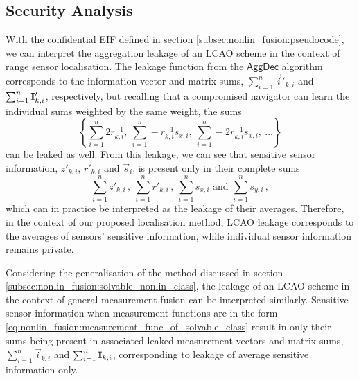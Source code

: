 \subsection{Security Analysis}\label{subsec:nonlin_fusion:security}
With the confidential EIF defined in section \ref{subsec:nonlin_fusion:pseudocode}, we can interpret the aggregation leakage of an LCAO scheme in the context of range sensor localisation. The leakage function from the $\mathsf{AggDec}$ algorithm corresponds to the information vector and matrix sums, $\sum_{i=1}^n\vec{i}'_{k, i}$ and $\sum_{i=1}^n{{\mathbf{I}}}'_{k, i}$, respectively, but recalling that a compromised navigator can learn the individual sums weighted by the same weight, the sums
\begin{equation}
    \left\{\sum_{i=1}^n2r^{-1}_{k, i},\ \sum_{i=1}^n-r^{-1}_{k, i}s_{x, i},\ \sum_{i=1}^n-2r^{-1}_{k, i}s_{x, i},\ \dots\right\}
\end{equation}
can be leaked as well. From this leakage, we can see that sensitive sensor information, $z'_{k, i}$, $r'_{k, i}$ and $\vec{s}_i$, is present only in their complete sums
\begin{equation}\label{eq:nonlin_fusion:localisation_leakage}
    \sum_{i=1}^nz'_{k,i}\,,\ \sum_{i=1}^nr'_{k,i}\,,\ \sum_{i=1}^ns_{x,i} \text{ and } \sum_{i=1}^ns_{y,i}\,,
\end{equation}
which can in practice be interpreted as the leakage of their averages. Therefore, in the context of our proposed localisation method, LCAO leakage corresponds to the averages of sensors' sensitive information, while individual sensor information remains private.

Considering the generalisation of the method discussed in section \ref{subsec:nonlin_fusion:solvable_nonlin_class}, the leakage of an LCAO scheme in the context of general measurement fusion can be interpreted similarly. Sensitive sensor information when measurement functions are in the form \eqref{eq:nonlin_fusion:measurement_func_of_solvable_class} result in only their sums being present in associated leaked measurement vectors and matrix sums, $\sum_{i=1}^n\vec{i}_{k, i}$ and $\sum_{i=1}^n{{\mathbf{I}}}_{k, i}$, corresponding to leakage of average sensitive information only.

% 
% 

